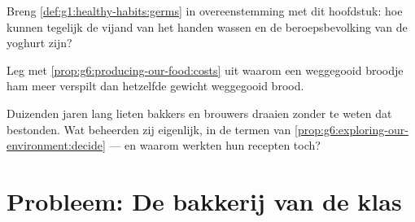 \begin{exercise}[$\star\star$]\label{exo:g6:producing-our-food:10}
Breng \cref{def:g1:healthy-habits:germs} in overeenstemming met dit
hoofdstuk: hoe kunnen  tegelijk de vijand van het handen wassen
en de beroepsbevolking van de yoghurt zijn?
\end{exercise}

\begin{exercise}[$\star\star$]\label{exo:g6:producing-our-food:11}
Leg met \cref{prop:g6:producing-our-food:costs} uit waarom een weggegooid
broodje ham meer verspilt dan hetzelfde gewicht weggegooid brood.
\end{exercise}

\begin{exercise}[$\star\star\star$]\label{exo:g6:producing-our-food:12}
Duizenden jaren lang lieten bakkers en brouwers  draaien zonder te
weten dat  bestonden. Wat beheerden zij eigenlijk, in de termen
van \cref{prop:g6:exploring-our-environment:decide} --- en waarom werkten
hun recepten toch?
\end{exercise}

\section{Probleem: De bakkerij van de klas}

